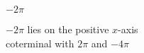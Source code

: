 {$-2\pi$}
{$-2\pi$ lies on the positive $x$-axis  \\
coterminal with $2\pi$ and $-4\pi$ 

\begin{center}
\end{center}}
